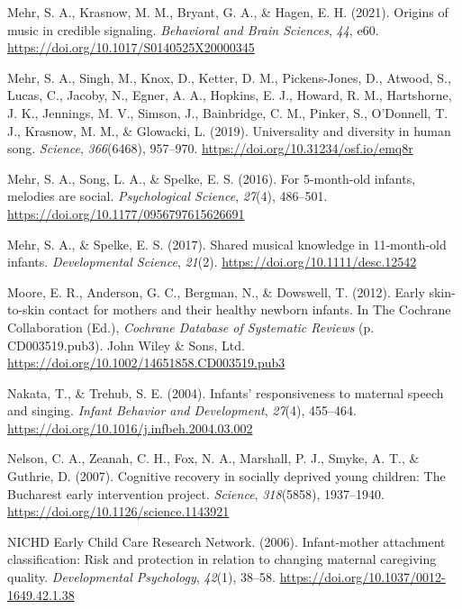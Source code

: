 \documentclass[
]{article}
\newlength{\cslhangindent}
\newenvironment{CSLReferences}[2] %
 {\begin{list}{}{%
  \setlength{\itemindent}{0pt}
  \setlength{\leftmargin}{0pt}
  \setlength{\parsep}{0pt}
  \ifodd #1
   \setlength{\leftmargin}{\cslhangindent}
   \setlength{\itemindent}{-1\cslhangindent}
  \fi
  \setlength{\itemsep}{#2\baselineskip}}}
 {\end{list}}
\begin{document}
\begin{CSLReferences}{1}{0}
Mehr, S. A., Krasnow, M. M., Bryant, G. A., \& Hagen, E. H. (2021).
Origins of music in credible signaling. \emph{Behavioral and Brain
Sciences}, \emph{44}, e60.
\url{https://doi.org/10.1017/S0140525X20000345}

Mehr, S. A., Singh, M., Knox, D., Ketter, D. M., Pickens-Jones, D.,
Atwood, S., Lucas, C., Jacoby, N., Egner, A. A., Hopkins, E. J., Howard,
R. M., Hartshorne, J. K., Jennings, M. V., Simson, J., Bainbridge, C.
M., Pinker, S., O'Donnell, T. J., Krasnow, M. M., \& Glowacki, L.
(2019). Universality and diversity in human song. \emph{Science},
\emph{366}(6468), 957--970. \url{https://doi.org/10.31234/osf.io/emq8r}

Mehr, S. A., Song, L. A., \& Spelke, E. S. (2016). For 5-month-old
infants, melodies are social. \emph{Psychological Science},
\emph{27}(4), 486--501. \url{https://doi.org/10.1177/0956797615626691}

Mehr, S. A., \& Spelke, E. S. (2017). Shared musical knowledge in
11‐month‐old infants. \emph{Developmental Science}, \emph{21}(2).
\url{https://doi.org/10.1111/desc.12542}

Moore, E. R., Anderson, G. C., Bergman, N., \& Dowswell, T. (2012).
Early skin-to-skin contact for mothers and their healthy newborn
infants. In The Cochrane Collaboration (Ed.), \emph{Cochrane {Database}
of {Systematic} {Reviews}} (p. CD003519.pub3). John Wiley \& Sons, Ltd.
\url{https://doi.org/10.1002/14651858.CD003519.pub3}

Nakata, T., \& Trehub, S. E. (2004). Infants' responsiveness to maternal
speech and singing. \emph{Infant Behavior and Development},
\emph{27}(4), 455--464.
\url{https://doi.org/10.1016/j.infbeh.2004.03.002}

Nelson, C. A., Zeanah, C. H., Fox, N. A., Marshall, P. J., Smyke, A. T.,
\& Guthrie, D. (2007). Cognitive recovery in socially deprived young
children: {The} {Bucharest} early intervention project. \emph{Science},
\emph{318}(5858), 1937--1940.
\url{https://doi.org/10.1126/science.1143921}

NICHD Early Child Care Research Network. (2006). Infant-mother
attachment classification: {Risk} and protection in relation to changing
maternal caregiving quality. \emph{Developmental Psychology},
\emph{42}(1), 38--58. \url{https://doi.org/10.1037/0012-1649.42.1.38}


\end{CSLReferences}
\end{document}

